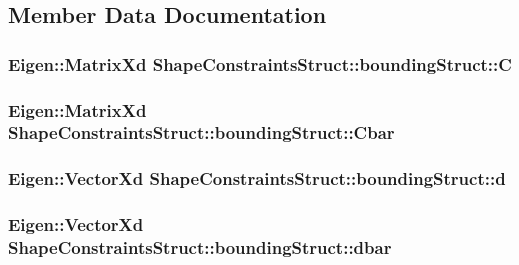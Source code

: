 \subsection{\-Member \-Data \-Documentation}
\hypertarget{structShapeConstraintsStruct_1_1boundingStruct_a888204a5f7e2ea854715605e1b6ba475}{
\subsubsection[{\-C}]{\setlength{\rightskip}{0pt plus 5cm}\-Eigen\-::\-Matrix\-Xd {\bf \-Shape\-Constraints\-Struct\-::bounding\-Struct\-::\-C}}}\label{structShapeConstraintsStruct_1_1boundingStruct_a888204a5f7e2ea854715605e1b6ba475}
\hypertarget{structShapeConstraintsStruct_1_1boundingStruct_acc45534da5c8b80be0012f6722d5569f}{
\subsubsection[{\-Cbar}]{\setlength{\rightskip}{0pt plus 5cm}\-Eigen\-::\-Matrix\-Xd {\bf \-Shape\-Constraints\-Struct\-::bounding\-Struct\-::\-Cbar}}}\label{structShapeConstraintsStruct_1_1boundingStruct_acc45534da5c8b80be0012f6722d5569f}
\hypertarget{structShapeConstraintsStruct_1_1boundingStruct_a6d157c6e92332f3abdce6ccd12206380}{
\subsubsection[{d}]{\setlength{\rightskip}{0pt plus 5cm}\-Eigen\-::\-Vector\-Xd {\bf \-Shape\-Constraints\-Struct\-::bounding\-Struct\-::d}}}\label{structShapeConstraintsStruct_1_1boundingStruct_a6d157c6e92332f3abdce6ccd12206380}
\hypertarget{structShapeConstraintsStruct_1_1boundingStruct_ab7b66b74697f335127d4a8cea0fecc2a}{
\subsubsection[{dbar}]{\setlength{\rightskip}{0pt plus 5cm}\-Eigen\-::\-Vector\-Xd {\bf \-Shape\-Constraints\-Struct\-::bounding\-Struct\-::dbar}}}\label{structShapeConstraintsStruct_1_1boundingStruct_ab7b66b74697f335127d4a8cea0fecc2a}
